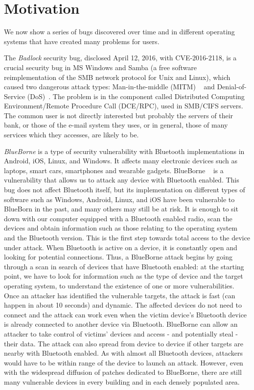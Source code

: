 \documentclass{masterthesis}
\newcommand{\vtnote}[1]{\todo[color=green!20]{#1}}
\begin{document}
\section{Motivation}
\label{sect:motiv}
\vtnote{aggiunta frase di intro}
We now show a series of bugs discovered over time and in different operating systems that have created many problems for users.

The \emph{Badlock} security bug, disclosed April 12, 2016, with CVE-2016-2118, is a crucial security bug in MS Windows and Samba (a free software reimplementation of the SMB network protocol for Unix and Linux), which caused two dangerous attack types: Man-in-the-middle (MITM) ~\cite{conti2016survey} and Denial-of-Service (DoS)~\cite{lau2000distributed}.
The problem is in the component called Distributed Computing Environment/Remote Procedure Call (DCE/RPC), used in SMB/CIFS servers.
The common user is not directly interested but probably the servers of their bank, or those of the e-mail system they uses, or in general, those of many services which they accesses, are likely to be.

\emph{BlueBorne} is a type of security vulnerability with Bluetooth implementations in Android, iOS, Linux, and Windows. It affects many electronic devices such as laptops, smart cars, smartphones and wearable gadgets.
BlueBorne ~\cite{bour2018bluetooth} is a vulnerability that allows us to attack any device with Bluetooth enabled. This bug does not affect Bluetooth itself, but its implementation on different types of software such as Windows, Android, Linux, and iOS have been vulnerable to BlueBorn in the past, and many others may still be at risk.
It is enough to sit down with our computer equipped with a Bluetooth enabled radio, scan the devices and obtain information such as those relating to the operating system and the Bluetooth version. This is the first step towards total access to the device under attack.
When Bluetooth is active on a device, it is constantly open and looking for potential connections. Thus, a BlueBorne attack begins by going through a scan in search of devices that have Bluetooth enabled: at the starting point, we have to look for information such as the type of device and the target operating system, to understand the existence of one or more vulnerabilities. Once an attacker has identified the vulnerable targets, the attack is fast (can happen in about 10 seconds) and dynamic. The affected devices do not need to connect and the attack can work even when the victim device's Bluetooth device is already connected to another device via Bluetooth.
BlueBorne can allow an attacker to take control of victims' devices and access - and potentially steal - their data. The attack can also spread from device to device if other targets are nearby with Bluetooth enabled. As with almost all Bluetooth devices, attackers would have to be within range of the device to launch an attack. However, even with the widespread diffusion of patches dedicated to BlueBorne, there are still many vulnerable devices in every building and in each densely populated area.
\end{document}
